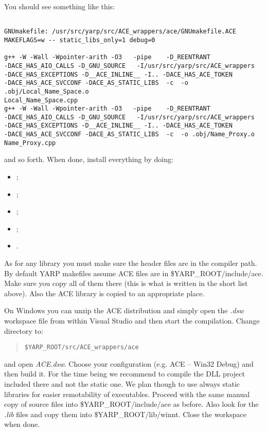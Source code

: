 You should see something like this:
\begin{verbatim}

GNUmakefile: /usr/src/yarp/src/ACE_wrappers/ace/GNUmakefile.ACE 
MAKEFLAGS=w -- static_libs_only=1 debug=0

g++ -W -Wall -Wpointer-arith -O3   -pipe    -D_REENTRANT 
-DACE_HAS_AIO_CALLS -D_GNU_SOURCE   -I/usr/src/yarp/src/ACE_wrappers 
-DACE_HAS_EXCEPTIONS -D__ACE_INLINE__ -I.. -DACE_HAS_ACE_TOKEN 
-DACE_HAS_ACE_SVCCONF -DACE_AS_STATIC_LIBS  -c  -o .obj/Local_Name_Space.o
Local_Name_Space.cpp
g++ -W -Wall -Wpointer-arith -O3   -pipe    -D_REENTRANT 
-DACE_HAS_AIO_CALLS -D_GNU_SOURCE   -I/usr/src/yarp/src/ACE_wrappers 
-DACE_HAS_EXCEPTIONS -D__ACE_INLINE__ -I.. -DACE_HAS_ACE_TOKEN 
-DACE_HAS_ACE_SVCCONF -DACE_AS_STATIC_LIBS  -c  -o .obj/Name_Proxy.o 
Name_Proxy.cpp

\end{verbatim}

\noindent and so forth. When done, install everything by doing:

\begin{itemize}
\item {};
\item {};
\item {};
\item {};
\item {}.
\end{itemize}

As for any library you must make sure the header files are in the compiler path. By default YARP makefiles assume ACE files are in \$YARP\_ROOT/include/ace. Make sure you copy all of them there (this is what is written in the short list above). Also the ACE library is copied to an appropriate place. 

On Windows you can unzip the ACE distribution and simply open the {\em .dsw} workspace file from within Visual Studio and then start the compilation. Change directory to:

\begin{quote}
{\tt \$YARP\_ROOT/src/ACE\_wrappers/ace}
\end{quote}
 
\noindent and open {\em ACE.dsw}. Choose your configuration (e.g. ACE -- Win32 Debug) and then build it. For the time being we recommend to compile the DLL project included there and not the static one. We plan though to use always static libraries for easier remotability of executables. Proceed with the same manual copy of source files into %
\$YARP\_ROOT/include/ace
as before. Also look for the {\em *.lib} files and copy them into
\$YARP\_ROOT/lib/winnt. 
Close the workspace when done.


